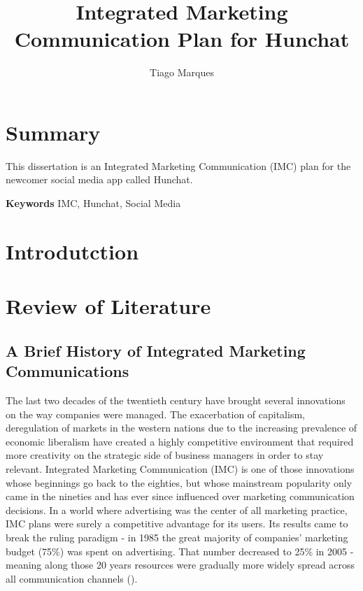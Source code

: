 \documentclass[11pt]{article}
\begin{document}
\begin{titlepage}
\title{Integrated Marketing Communication Plan for Hunchat}
\author{Tiago Marques}
\maketitle
\end{titlepage}


\section*{Summary}
This dissertation is an Integrated Marketing Communication (IMC) plan for the newcomer social media app called Hunchat.
  \par
 \textbf{Keywords} IMC, Hunchat, Social Media
\cleardoublepage

\thispagestyle{empty}

\tableofcontents
\cleardoublepage 
\listoffigures
\listoftables 
\thispagestyle{empty}
\cleardoublepage 
\setcounter{page}{1}
 
\section{Introdutction}\label{intro}

\newpage	
\section{Review of Literature}\label{review}
\subsection{A Brief History of Integrated Marketing Communications}\label{IMC}
The last two decades of the twentieth century have brought several innovations on the way companies were managed. The exacerbation of capitalism, deregulation of markets in the western nations due to the increasing prevalence of economic liberalism have created a highly competitive environment that required more creativity on the strategic side of business managers in order to stay relevant. Integrated Marketing Communication (IMC) is one of those innovations whose beginnings go back to the eighties, but whose mainstream popularity only came in the nineties and has ever since influenced over marketing communication decisions. In a world where advertising was the center of all marketing practice, IMC plans were surely a competitive advantage for its users. Its results came to break the ruling paradigm - in 1985 the great majority  of companies' marketing budget (75\%) was spent on advertising. That number decreased to 25\% in 2005 - meaning along those 20 years resources were gradually more widely spread across all communication channels (\cite{holm}).  
\end{document}
